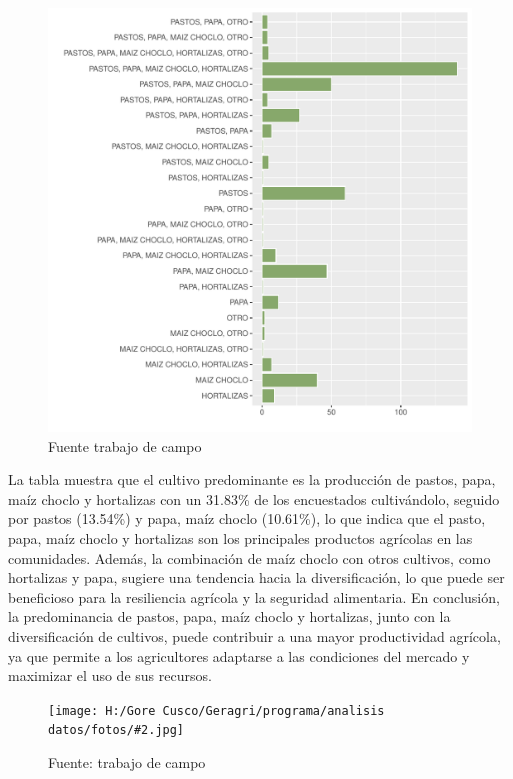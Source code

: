 \documentclass{article}\usepackage[]{graphicx}\usepackage[table]{xcolor}
\makeatletter
\def\maxwidth{ %
  \ifdim\Gin@nat@width>\linewidth
    \linewidth
  \else
    \Gin@nat@width
  \fi
}
\newenvironment{knitrout}{}{} %
\newenvironment{fotos}[2]
{\begin{figure}[H]
	\centering
	\caption{#1}
	\texttt{[image: H:/Gore Cusco/Geragri/programa/analisis datos/fotos/\#2.jpg]}
	\caption*{Fuente: trabajo de campo}}
{\end{figure}}
\newenvironment{graficas}[2]
{\begin{figure}[H]
		\centering
		\caption{#1}
		#2
		\caption*{Fuente trabajo de campo}}
{\end{figure}}
\makeatother
\begin{document}
\begin{graficas}
{Produccion predominante}{
\begin{knitrout}
\definecolor{shadecolor}{rgb}{0.969, 0.969, 0.969}\color{fgcolor}
\includegraphics[width=\maxwidth]{figure/fig_veintiocho-1} 
\end{knitrout}
}
\end{graficas}
La tabla muestra que el cultivo predominante es la producción de pastos, papa, maíz choclo y hortalizas con un 31.83\% de los encuestados cultivándolo, seguido por pastos (13.54\%) y papa, maíz choclo (10.61\%), lo que indica que el pasto, papa, maíz choclo y hortalizas son los principales productos agrícolas en las comunidades. Además, la combinación de maíz choclo con otros cultivos, como hortalizas y papa, sugiere una tendencia hacia la diversificación, lo que puede ser beneficioso para la resiliencia agrícola y la seguridad alimentaria. En conclusión, la predominancia de pastos, papa, maíz choclo y hortalizas, junto con la diversificación de cultivos, puede contribuir a una mayor productividad agrícola, ya que permite a los agricultores adaptarse a las condiciones del mercado y maximizar el uso de sus recursos.
\begin{fotos}
{aplicacion de encuesta}{26}
\end{fotos}
\end{document}
